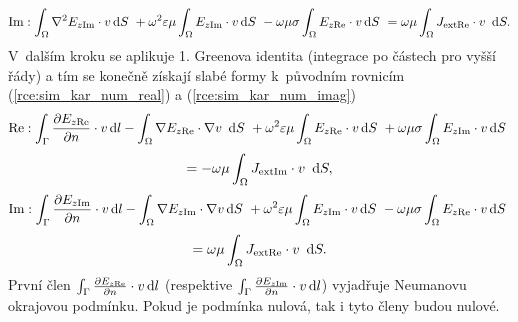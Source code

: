 \begin{equation}
	\mathrm{Im} : \int_{\Omega}\nabla^{2} E_{z\mathrm{Im}}\cdot v\,\mathrm{d} S~+ \omega^{2}\varepsilon\mu\int_{\Omega} E_{z\mathrm{Im}}\cdot v\,\mathrm{d} S~- \omega\mu\sigma\int_{\Omega} E_{z\mathrm{Re}}\cdot v\,\mathrm{d} S~= \omega\mu \int_{\Omega}J_{\mathrm{ext}\mathrm{Re}}\cdot v~\,\mathrm{d} S.
	\label{rce:sim_kar_weak_odv_imag} 
\end{equation}
V~dalším kroku se aplikuje 1. Greenova identita \cite[příloha A.2]{num} (integrace po částech pro vyšší řády) a tím se konečně získají slabé formy k~původním rovnicím (\ref{rce:sim_kar_num_real}) a (\ref{rce:sim_kar_num_imag})
\begin{displaymath}
\mathrm{Re} : \int_{\Gamma}\frac{\partial E_{z\mathrm{Re}}}{\partial n}\cdot v\,\mathrm{d} l-\int_{\Omega}\nabla E_{z\mathrm{Re}}\cdot\nabla v~\,\mathrm{d} S~+ \omega^{2}\varepsilon\mu\int_{\Omega} E_{z\mathrm{Re}}\cdot v\,\mathrm{d} S~+ \omega\mu\sigma\int_{\Omega} E_{z\mathrm{Im}}\cdot v\,\mathrm{d}
S~\end{displaymath}
\begin{equation}
	 = - \omega\mu \int_{\Omega}J_{\mathrm{ext}\mathrm{Im}}\cdot v~\,\mathrm{d} S,
	\label{rce:sim_kar_weak_real} 
\end{equation}
\begin{displaymath}
\mathrm{Im} : \int_{\Gamma}\frac{\partial E_{z\mathrm{Im}}}{\partial n}\cdot v\,\mathrm{d} l-\int_{\Omega}\nabla E_{z\mathrm{Im}}\cdot\nabla v\,\mathrm{d} S~+ \omega^{2}\varepsilon\mu\int_{\Omega} E_{z\mathrm{Im}}\cdot v\,\mathrm{d} S~- \omega\mu\sigma\int_{\Omega} E_{z\mathrm{Re}}\cdot v\,\mathrm{d} S~\end{displaymath}
\begin{equation}
	= \omega\mu \int_{\Omega}J_{\mathrm{ext}\mathrm{Re}}\cdot v~\,\mathrm{d} S.
	\label{rce:sim_kar_weak_imag} 
\end{equation}
První člen $\int_{\Gamma}\frac{\partial E_{z\mathrm{Re}}}{\partial n}\cdot v\,\mathrm{d} l$ (respektive $\int_{\Gamma}\frac{\partial E_{z\mathrm{Im}}}{\partial n}\cdot v\,\mathrm{d} l$) vyjadřuje Neumanovu okrajovou podmínku. Pokud je podmínka nulová, tak i tyto členy budou nulové. 

